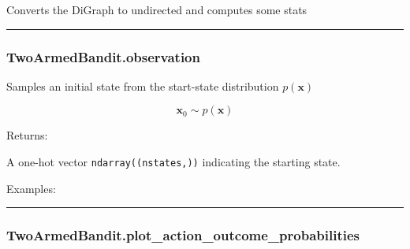 Converts the DiGraph to undirected and computes some stats

\begin{center}\rule{0.5\linewidth}{\linethickness}\end{center}

\hypertarget{twoarmedbandit.observation}{%
\subsubsection{TwoArmedBandit.observation}\label{twoarmedbandit.observation}}

\begin{Shaded}
\begin{Highlighting}[]
\NormalTok{)}
\end{Highlighting}
\end{Shaded}

Samples an initial state from the start-state distribution
\(p(\mathbf x)\)

\[
\mathbf x_0 \sim p(\mathbf x)
\]

Returns:

A one-hot vector \texttt{ndarray((nstates,))} indicating the starting
state.

Examples:

\begin{Shaded}
\begin{Highlighting}[]
\OperatorTok{=}
\end{Highlighting}
\end{Shaded}

\begin{center}\rule{0.5\linewidth}{\linethickness}\end{center}

\hypertarget{twoarmedbandit.plot_action_outcome_probabilities}{%
\subsubsection{TwoArmedBandit.plot\_action\_outcome\_probabilities}\label{twoarmedbandit.plot_action_outcome_probabilities}}

\begin{Shaded}
\begin{Highlighting}[]
\OperatorTok{=}\OperatorTok{=}\OperatorTok{=}\OperatorTok{=}\NormalTok{)}
\end{Highlighting}
\end{Shaded}

